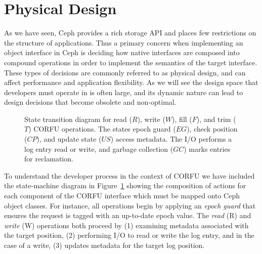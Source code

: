 \documentclass[10pt,twocolumn]{article}
\begin{document}
\section{Physical Design}

As we have seen, Ceph provides a rich storage API and places few restrictions
on the structure of applications. Thus a primary concern when implementing an
object interface in Ceph is deciding how native interfaces are composed into
compound operations in order to implement the semantics of the target
interface. These types of decisions are commonly referred to as
physical design, and can affect performance and application flexibility.
As we will see the design space that developers must operate in is often
large, and its dynamic nature can lead to design decisions that become
obsolete and non-optimal.

\begin{figure}[t]
\centering
{}
\caption{State transition diagram for read ($R$), write ($W$), fill ($F$), and
trim ($T$) CORFU operations. The states epoch guard ($EG$), check position ($CP$),
and update state ($US$) access metadata. The I/O performs a log entry read or
write, and garbage collection ($GC$) marks entries for reclamation.}
\label{fig:corfu-sm}
\end{figure}

To understand the developer process in the context of CORFU we have included the
state-machine diagram in Figure~\ref{fig:corfu-sm} showing the composition of
actions for each component of the CORFU interface which must be mapped onto
Ceph object classes. For instance, all operations begin by applying an
\emph{epoch guard} that ensures the request is tagged with an up-to-date epoch
value. The \emph{read} (R) and \emph{write} (W) operations both proceed by (1)
examining metadata associated with the target position, (2) performing I/O to
read or write the log entry, and in the case of a write, (3) updates metadata
for the target log position.
\end{document}
